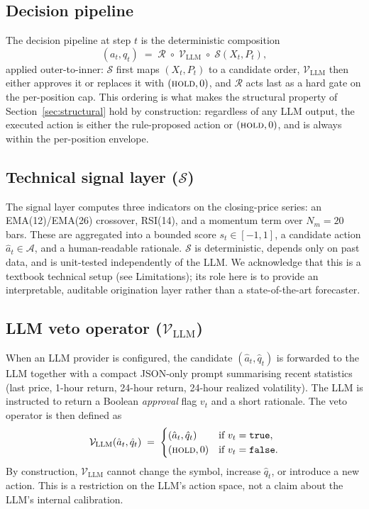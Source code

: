 \documentclass{article}
\begin{document}
\subsection{Decision pipeline}
The decision pipeline at step $t$ is the deterministic composition
\begin{equation}
  (a_t, q_t) \;=\; \mathcal{R} \;\circ\; \mathcal{V}_{\text{LLM}} \;\circ\; \mathcal{S}(X_t, P_t),
  \label{eq:pipeline}
\end{equation}
applied outer-to-inner: $\mathcal{S}$ first maps $(X_t, P_t)$ to a candidate order, $\mathcal{V}_{\text{LLM}}$ then either approves it or replaces it with $(\textsc{hold}, 0)$, and $\mathcal{R}$ acts last as a hard gate on the per-position cap. This ordering is what makes the structural property of Section~\ref{sec:structural} hold by construction: regardless of any LLM output, the executed action is either the rule-proposed action or $(\textsc{hold}, 0)$, and is always within the per-position envelope.

\subsection{Technical signal layer ($\mathcal{S}$)}
\label{sec:signals}
The signal layer computes three indicators on the closing-price series: an EMA(12)/EMA(26) crossover, RSI(14), and a momentum term over $N_m=20$ bars. These are aggregated into a bounded score $s_t \in [-1, 1]$, a candidate action $\hat{a}_t \in \mathcal{A}$, and a human-readable rationale. $\mathcal{S}$ is deterministic, depends only on past data, and is unit-tested independently of the LLM. We acknowledge that this is a textbook technical setup (see Limitations); its role here is to provide an interpretable, auditable origination layer rather than a state-of-the-art forecaster.

\subsection{LLM veto operator ($\mathcal{V}_{\text{LLM}}$)}
\label{sec:llm-veto}
When an LLM provider is configured, the candidate $(\hat{a}_t, \hat{q}_t)$ is forwarded to the LLM together with a compact JSON-only prompt summarising recent statistics (last price, 1-hour return, 24-hour return, 24-hour realized volatility). The LLM is instructed to return a Boolean \emph{approval} flag $v_t$ and a short rationale. The veto operator is then defined as
\begin{equation}
  \mathcal{V}_{\text{LLM}}(\hat{a}_t, \hat{q}_t) \;=\;
    \begin{cases}
      (\hat{a}_t, \hat{q}_t) & \text{if } v_t = \texttt{true}, \\
      (\textsc{hold}, 0)     & \text{if } v_t = \texttt{false}.
    \end{cases}
\end{equation}
By construction, $\mathcal{V}_{\text{LLM}}$ cannot change the symbol, increase $\hat{q}_t$, or introduce a new action. This is a restriction on the LLM\textquoteright s action space, not a claim about the LLM\textquoteright s internal calibration.
\end{document}
